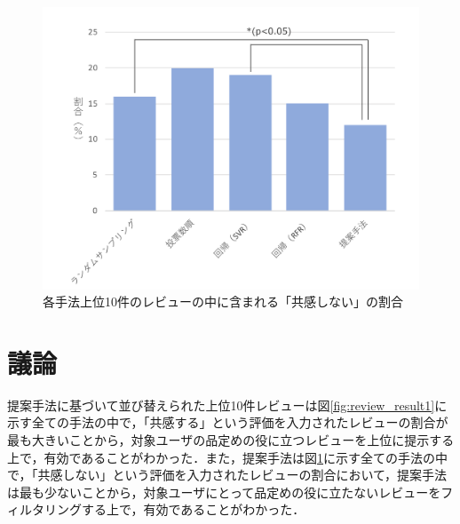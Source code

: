 \documentclass[a4paper,11pt,oneside,openany]{jsbook}
\begin{document}
\begin{figure}[htb]
	\begin{center} %
		\includegraphics [width = 120mm] {figures/review_result2.pdf} %
	\end{center}
	\caption{各手法上位10件のレビューの中に含まれる「共感しない」の割合} %
	\label{fig:review_result2} %
\end{figure}

	\section{議論}
提案手法に基づいて並び替えられた上位10件レビューは図\ref{fig:review_result1}に示す全ての手法の中で，「共感する」という評価を入力されたレビューの割合が最も大きいことから，対象ユーザの品定めの役に立つレビューを上位に提示する上で，有効であることがわかった．また，提案手法は図\ref{fig:review_result2}に示す全ての手法の中で，「共感しない」という評価を入力されたレビューの割合において，提案手法は最も少ないことから，対象ユーザにとって品定めの役に立たないレビューをフィルタリングする上で，有効であることがわかった．
\end{document}
